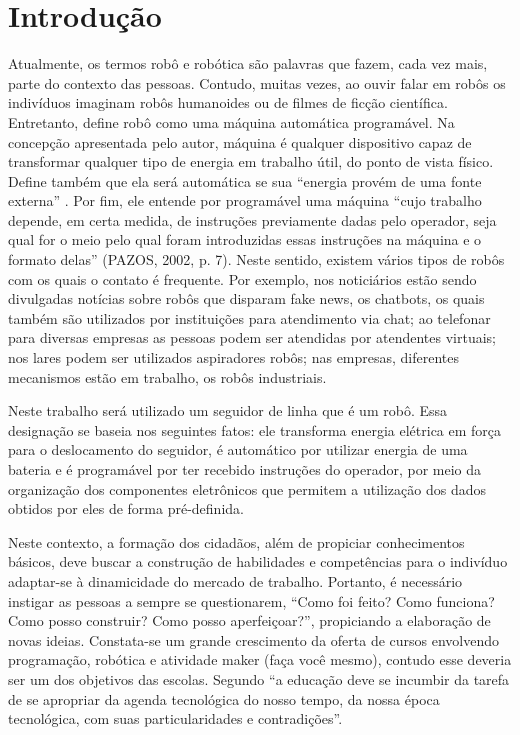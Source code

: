 \documentclass{textolivre-html}
\begin{document}
\begin{poliabstract}
\begin{english}
\begin{abstract}
\end{abstract}
\end{english}

\end{poliabstract}


\section{Introdução}\label{sec-intro}
Atualmente, os termos robô e robótica são palavras que fazem, cada vez mais,
parte do contexto das pessoas. Contudo, muitas vezes, ao ouvir falar em robôs
os indivíduos imaginam robôs humanoides ou de filmes de ficção científica.
Entretanto, \textcite[p. 8]{pazos2002} define robô como uma máquina automática
programável. Na concepção apresentada pelo autor, máquina é qualquer
dispositivo capaz de transformar qualquer tipo de energia em trabalho útil, do
ponto de vista físico. Define também que ela será automática se sua “energia
provém de uma fonte externa” \cite[p. 7]{pazos2002}. Por fim, ele entende por
programável uma máquina “cujo trabalho depende, em certa medida, de instruções
previamente dadas pelo operador, seja qual for o meio pelo qual foram
introduzidas essas instruções na máquina e o formato delas” (PAZOS, 2002, p.
7). Neste sentido, existem vários tipos de robôs com os quais o contato é
frequente. Por exemplo, nos noticiários estão sendo divulgadas notícias sobre
robôs que disparam fake news, os chatbots, os quais também são utilizados por
instituições para atendimento via chat; ao telefonar para diversas empresas as
pessoas podem ser atendidas por atendentes virtuais; nos lares podem ser
utilizados aspiradores robôs; nas empresas, diferentes mecanismos estão em
trabalho, os robôs industriais.

Neste trabalho será utilizado um seguidor de linha que é um robô. Essa
designação se baseia nos seguintes fatos: ele transforma energia elétrica em
força para o deslocamento do seguidor, é automático por utilizar energia de uma
bateria e é programável por ter recebido instruções do operador, por meio da
organização dos componentes eletrônicos que permitem a utilização dos dados
obtidos por eles de forma pré-definida.

Neste contexto, a formação dos cidadãos, além de propiciar conhecimentos
básicos, deve buscar a construção de habilidades e competências para o
indivíduo adaptar-se à dinamicidade do mercado de trabalho. Portanto, é
necessário instigar as pessoas a sempre se questionarem, “Como foi feito? Como
funciona? Como posso construir? Como posso aperfeiçoar?”, propiciando a
elaboração de novas ideias. Constata-se um grande crescimento da oferta de
cursos envolvendo programação, robótica e atividade maker (faça você mesmo),
contudo esse deveria ser um dos objetivos das escolas. Segundo \textcite[p. 27]{santos2019}
“a educação deve se incumbir da tarefa de se apropriar da agenda
tecnológica do nosso tempo, da nossa época tecnológica, com suas
particularidades e contradições”.
\end{document}
